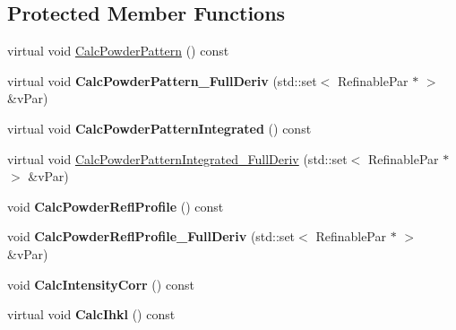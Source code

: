 \subsection*{Protected Member Functions}
\begin{DoxyCompactItemize}
\item 
virtual void \mbox{\hyperlink{class_obj_cryst_1_1_powder_pattern_diffraction_a4c7d61b5c105ee235629a4dfdbdf9949}{Calc\+Powder\+Pattern}} () const
\item 
\mbox{\label{class_obj_cryst_1_1_powder_pattern_diffraction_ad9c6ec8c2b92fe995e40eb4905769f16}} 
virtual void {\bfseries Calc\+Powder\+Pattern\+\_\+\+Full\+Deriv} (std\+::set$<$ Refinable\+Par $\ast$ $>$ \&v\+Par)
\item 
\mbox{\label{class_obj_cryst_1_1_powder_pattern_diffraction_a3c0f63814a0e564085fe2a1598e59f95}} 
virtual void {\bfseries Calc\+Powder\+Pattern\+Integrated} () const
\item 
virtual void \mbox{\hyperlink{class_obj_cryst_1_1_powder_pattern_diffraction_a47a3a1e09d0ab4c4f092384650db3efd}{Calc\+Powder\+Pattern\+Integrated\+\_\+\+Full\+Deriv}} (std\+::set$<$ Refinable\+Par $\ast$ $>$ \&v\+Par)
\item 
\mbox{\label{class_obj_cryst_1_1_powder_pattern_diffraction_abc57057f0ece09bc6fb33be1adc9f62f}} 
void {\bfseries Calc\+Powder\+Refl\+Profile} () const
\item 
\mbox{\label{class_obj_cryst_1_1_powder_pattern_diffraction_a60eea240e298b2f2eedf86b75629fdb1}} 
void {\bfseries Calc\+Powder\+Refl\+Profile\+\_\+\+Full\+Deriv} (std\+::set$<$ Refinable\+Par $\ast$ $>$ \&v\+Par)
\item 
\mbox{\label{class_obj_cryst_1_1_powder_pattern_diffraction_a7d5e36997afff560cb168544dd5fdc56}} 
void {\bfseries Calc\+Intensity\+Corr} () const
\item 
\mbox{\label{class_obj_cryst_1_1_powder_pattern_diffraction_a8ebc1c0f44807aa2052f6dc19179b549}} 
virtual void {\bfseries Calc\+Ihkl} () const

\end{DoxyCompactItemize}
